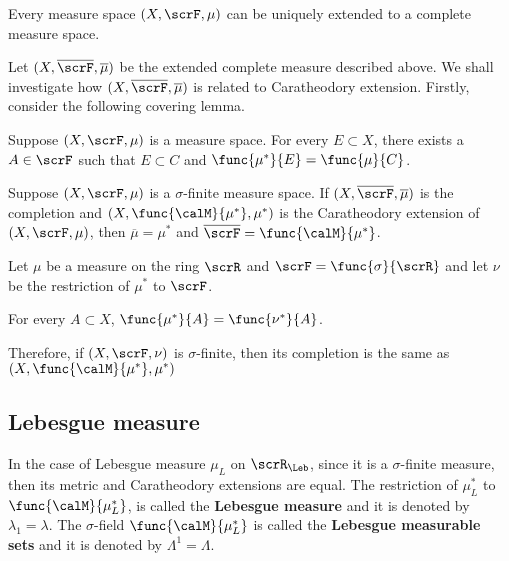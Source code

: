 \begin{theorem}
    Every measure space \((X,\scrF,\mu)\) can be uniquely extended to a complete measure space.
\end{theorem}

Let \((X,\overline{\scrF}, \overline{\mu})\) be the extended complete measure described above. We shall investigate how \((X,\overline{\scrF},\overline{\mu})\) is related to Caratheodory extension. Firstly, consider the following covering lemma.
\begin{lemma}
    Suppose \((X,\scrF,\mu)\) is a measure space. For every \(E \subset X\), there exists a \(A \in \scrF\) such that \(E \subset C\) and \(\func{\mu^{\ast}}{E} = \func{\mu}{C}\).
\end{lemma}

\begin{theorem}
    Suppose \((X,\scrF,\mu)\) is a \(\sigma\)-finite measure space. If \((X,\overline{\scrF},\overline{\mu})\) is the completion and \((X,\func{\calM}{\mu^{\ast}},\mu^{\ast})\) is the Caratheodory extension of \((X,\scrF,\mu)\), then \(\overline{\mu} = \mu^{\ast}\) and \(\overline{\scrF} = \func{\calM}{\mu^{\ast}}\).
\end{theorem}

Let \(\mu\) be a measure on the ring \(\scrR\) and \(\scrF = \func{\sigma}{\scrR}\) and let \(\nu\) be the restriction of \(\mu^{\ast}\) to \(\scrF\).
\begin{theorem}
    For every \(A \subset X\), \(\func{\mu^{\ast}}{A} = \func{\nu^{\ast}}{A}\).
\end{theorem}
Therefore, if \((X,\scrF,\nu)\) is \(\sigma\)-finite, then its completion is the same as \((X,\func{\calM}{\mu^{\ast}},\mu^{\ast})\)

\subsection{Lebesgue measure}

\begin{example}
    In the case of Lebesgue measure \(\mu_L\) on \(\scrR_{\Leb}\), since it is a \(\sigma\)-finite measure, then its metric and Caratheodory extensions are equal. The restriction of \(\mu_L^{\ast}\) to \(\func{\calM}{\mu_L^{\ast}}\), is called the \textbf{Lebesgue measure} and it is denoted by \(\lambda_1 = \lambda\). The \(\sigma\)-field \(\func{\calM}{\mu_L^{\ast}}\) is called the \textbf{Lebesgue measurable sets} and it is denoted by \(\Lambda^1 = \Lambda\).
\end{example}

